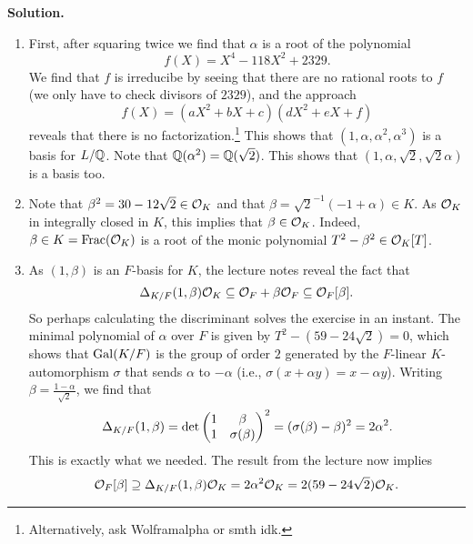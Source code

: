 \documentclass[a4paper,11pt]{article}
\begin{document}
\textbf{Solution.}
\begin{enumerate}
    \item First, after squaring twice we find that $\alpha$ is a root of the
        polynomial
        \begin{equation*}
            f(X) = X^4 - 118X^2 + 2329.
        \end{equation*}
        We find that $f$ is irreducibe by seeing that there are no rational roots to $f$
        (we only have to check divisors of $2329$), and the approach
        \begin{equation*}
            f(X) = (aX^2 + bX + c)(dX^2 + eX + f)
        \end{equation*}
        reveals that there is no factorization.\footnote{Alternatively, ask Wolframalpha
        or smth idk.} This shows that 
        $(1, \alpha, \alpha^2, \alpha^3)$ is a basis for $L/\mathbb{Q}$. Note that
        $\mathbb{Q}(\alpha^2) = \mathbb{Q}(\sqrt 2)$. This shows that $(1, \alpha, \sqrt 2, \sqrt 2 \alpha)$
        is a basis too.
    \item Note that $\beta^2 = 30 - 12\sqrt 2 \in \mathcal{O}_K$ and that $\beta = \sqrt 2^{-1}
        (-1 + \alpha) \in K$. As $\mathcal{O}_K$ in integrally closed in $K$, this implies that 
        $\beta \in \mathcal{O}_K$. Indeed, $\beta \in K = \mathrm{Frac} (\mathcal{O}_K)$ is a root of the monic
        polynomial $T^2 - \beta^2 \in \mathcal{O}_K[T]$.
    \item As $(1, \beta)$ is an $F$-basis for $K$, the lecture notes reveal the
        fact that $$\Delta_{K/F}(1, \beta) \mathcal{O}_K \subseteq \mathcal{O}_F + \beta \mathcal{O}_F
        \subseteq \mathcal{O}_F[\beta].$$ So perhaps calculating
        the discriminant solves the exercise in an instant. 
        The minimal polynomial of $\alpha$ over $F$ is given by $T^2 - (59 -
        24\sqrt 2) = 0$, which shows that $\operatorname{Gal}(K/F)$ is the group of order $2$
        generated by the $F$-linear $K$-automorphism $\sigma$ that sends $\alpha$ to 
        $-\alpha$ (i.e., $\sigma(x + \alpha y) = x - \alpha y$). Writing $\beta = \frac {1 - \alpha}{\sqrt 2}$, we find that 
        \begin{equation*}
            \Delta_{K/F}(1, \beta) = \det \begin{pmatrix} 1 & \beta\\ 1 & \sigma(\beta) \end{pmatrix}^2
            = (\sigma(\beta) - \beta)^2 = 2 \alpha^2.
        \end{equation*}
        This is exactly what we needed. The result from the lecture now implies
        \begin{equation*}
            \mathcal{O}_F[\beta] \supseteq \Delta_{K/F}(1, \beta) \mathcal{O}_K
            = 2 \alpha^2 \mathcal{O}_K = 2(59 - 24\sqrt 2) \mathcal{O}_K.
        \end{equation*}

        
\end{enumerate}


\contactend
\end{document}
